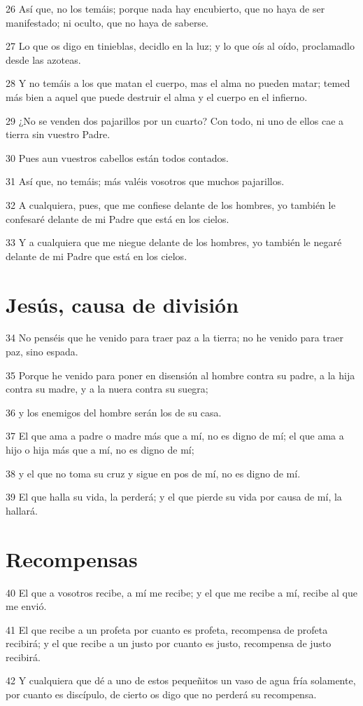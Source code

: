 \par 26 Así que, no los temáis; porque nada hay encubierto, que no haya de ser manifestado; ni oculto, que no haya de saberse.
\par 27 Lo que os digo en tinieblas, decidlo en la luz; y lo que oís al oído, proclamadlo desde las azoteas.
\par 28 Y no temáis a los que matan el cuerpo, mas el alma no pueden matar; temed más bien a aquel que puede destruir el alma y el cuerpo en el infierno.
\par 29 ¿No se venden dos pajarillos por un cuarto? Con todo, ni uno de ellos cae a tierra sin vuestro Padre.
\par 30 Pues aun vuestros cabellos están todos contados.
\par 31 Así que, no temáis; más valéis vosotros que muchos pajarillos.
\par 32 A cualquiera, pues, que me confiese delante de los hombres, yo también le confesaré delante de mi Padre que está en los cielos.
\par 33 Y a cualquiera que me niegue delante de los hombres, yo también le negaré delante de mi Padre que está en los cielos.

\section*{Jesús, causa de división}

\par 34 No penséis que he venido para traer paz a la tierra; no he venido para traer paz, sino espada.
\par 35 Porque he venido para poner en disensión al hombre contra su padre, a la hija contra su madre, y a la nuera contra su suegra;
\par 36 y los enemigos del hombre serán los de su casa.
\par 37 El que ama a padre o madre más que a mí, no es digno de mí; el que ama a hijo o hija más que a mí, no es digno de mí;
\par 38 y el que no toma su cruz y sigue en pos de mí, no es digno de mí.
\par 39 El que halla su vida, la perderá; y el que pierde su vida por causa de mí, la hallará.

\section*{Recompensas}

\par 40 El que a vosotros recibe, a mí me recibe; y el que me recibe a mí, recibe al que me envió.
\par 41 El que recibe a un profeta por cuanto es profeta, recompensa de profeta recibirá; y el que recibe a un justo por cuanto es justo, recompensa de justo recibirá.
\par 42 Y cualquiera que dé a uno de estos pequeñitos un vaso de agua fría solamente, por cuanto es discípulo, de cierto os digo que no perderá su recompensa.

